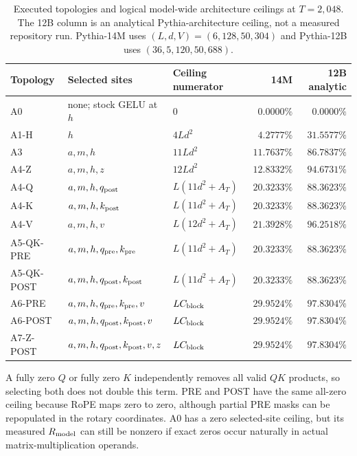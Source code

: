 \begin{table}[H]
\centering
\caption{Executed topologies and logical model-wide architecture ceilings at
$T=2{,}048$. The 12B column is an analytical Pythia-architecture ceiling, not
a measured repository run. Pythia-14M uses $(L,d,V)=(6,128,50{,}304)$ and
Pythia-12B uses $(36,5{,}120,50{,}688)$.}
\label{tab:topology-ceilings}
\small
\setlength{\tabcolsep}{3.4pt}
\begin{tabularx}{\linewidth}{@{}l X l r r@{}}
\toprule
Topology & Selected sites & Ceiling numerator & 14M & 12B analytic \\
\midrule
A0 & none; stock GELU at $h$ & $0$ & $0.0000\%$ & $0.0000\%$ \\
A1-H & $h$ & $4Ld^2$ & $4.2777\%$ & $31.5577\%$ \\
A3 & $a,m,h$ & $11Ld^2$ & $11.7637\%$ & $86.7837\%$ \\
A4-Z & $a,m,h,z$ & $12Ld^2$ & $12.8332\%$ & $94.6731\%$ \\
A4-Q & $a,m,h,q_{\mathrm{post}}$ & $L(11d^2+A_T)$ & $20.3233\%$ & $88.3623\%$ \\
A4-K & $a,m,h,k_{\mathrm{post}}$ & $L(11d^2+A_T)$ & $20.3233\%$ & $88.3623\%$ \\
A4-V & $a,m,h,v$ & $L(12d^2+A_T)$ & $21.3928\%$ & $96.2518\%$ \\
A5-QK-PRE & $a,m,h,q_{\mathrm{pre}},k_{\mathrm{pre}}$ & $L(11d^2+A_T)$ & $20.3233\%$ & $88.3623\%$ \\
A5-QK-POST & $a,m,h,q_{\mathrm{post}},k_{\mathrm{post}}$ & $L(11d^2+A_T)$ & $20.3233\%$ & $88.3623\%$ \\
A6-PRE & $a,m,h,q_{\mathrm{pre}},k_{\mathrm{pre}},v$ & $LC_{\mathrm{block}}$ & $29.9524\%$ & $97.8304\%$ \\
A6-POST & $a,m,h,q_{\mathrm{post}},k_{\mathrm{post}},v$ & $LC_{\mathrm{block}}$ & $29.9524\%$ & $97.8304\%$ \\
A7-Z-POST & $a,m,h,q_{\mathrm{post}},k_{\mathrm{post}},v,z$ & $LC_{\mathrm{block}}$ & $29.9524\%$ & $97.8304\%$ \\
\bottomrule
\end{tabularx}
\end{table}

A fully zero $Q$ or fully zero $K$ independently removes all valid $QK$
products, so selecting both does not double this term. PRE and POST have the
same all-zero ceiling because RoPE maps zero to zero, although partial PRE
masks can be repopulated in the rotary coordinates. A0 has a zero selected-site
ceiling, but its measured $R_{\mathrm{model}}$ can still be nonzero if exact zeros occur
naturally in actual matrix-multiplication operands.

